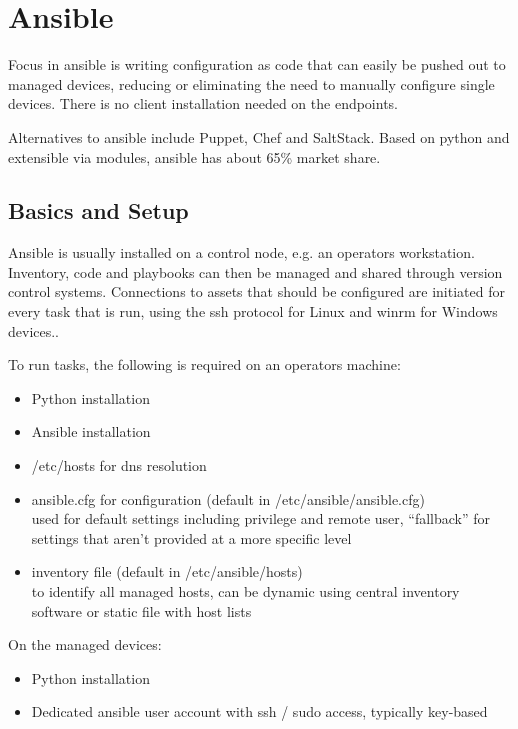 \section{Ansible}
Focus in ansible is writing configuration as code that can easily be pushed out to managed devices, 
reducing or eliminating the need to manually configure single devices. 
There is no client installation needed on the endpoints. 

Alternatives to ansible include Puppet, Chef and SaltStack. Based on python and extensible via modules, ansible has about 65\% market share.   

\subsection{Basics and Setup}
Ansible is usually installed on a control node, e.g. an operators workstation. Inventory, code and playbooks can then be managed and shared through version control systems. 
Connections to assets that should be configured are initiated for every task that is run, using the ssh protocol for Linux and winrm for Windows devices..


To run tasks, the following is required on an operators machine:
\begin{itemize}
    \item Python installation
    \item Ansible installation
    \item \ttfamily/etc/hosts \rmfamily for dns resolution
    \item ansible.cfg for configuration (default in \ttfamily/etc/ansible/ansible.cfg\rmfamily) \\ 
    used for default settings including privilege and remote user, ``fallback'' for settings that aren't provided at a more specific level
    \item inventory file (default in \ttfamily/etc/ansible/hosts\rmfamily) \\
     to identify all managed hosts, can be dynamic using central inventory software or static file with host lists
\end{itemize}

\noindent
On the managed devices:
\begin{itemize}
    \item Python installation
    \item Dedicated ansible user account with ssh / sudo access, typically key-based
\end{itemize}

